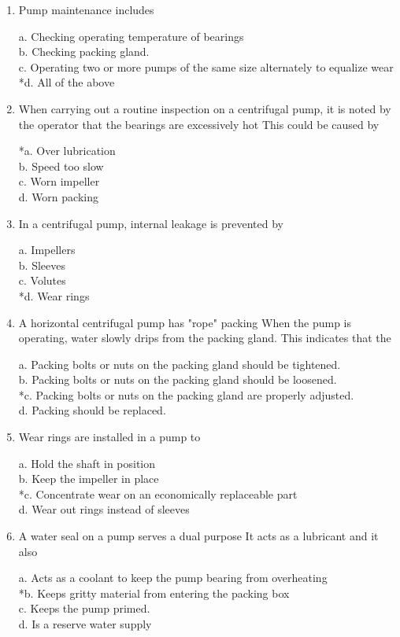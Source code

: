 \begin{enumerate}[1.]
\item  Pump maintenance includes 

a. Checking operating temperature of bearings \\
b. Checking packing gland. \\
c. Operating two or more pumps of the same size alternately to equalize wear \\
*d. All of the above 


\item  When carrying out a routine inspection on a centrifugal pump, it is noted by the operator that the bearings are excessively hot This could be caused by 

*a. Over lubrication \\
b. Speed too slow \\
c. Worn impeller \\
d. Worn packing 


\item  In a centrifugal pump, internal leakage is prevented by 

a. Impellers \\
b. Sleeves \\
c. Volutes \\
*d. Wear rings 


\item  A horizontal centrifugal pump has "rope" packing When the pump is operating, water slowly drips from the packing gland. This indicates that the 

a. Packing bolts or nuts on the packing gland should be tightened. \\
b. Packing bolts or nuts on the packing gland should be loosened. \\
*c. Packing bolts or nuts on the packing gland are properly adjusted. \\
d. Packing should be replaced. 


\item  Wear rings are installed in a pump to 

a. Hold the shaft in position \\
b. Keep the impeller in place \\
*c. Concentrate wear on an economically replaceable part \\
d. Wear out rings instead of sleeves 


\item  A water seal on a pump serves a dual purpose It acts as a lubricant and it also 

a. Acts as a coolant to keep the pump bearing from overheating \\
*b. Keeps gritty material from entering the packing box \\
c. Keeps the pump primed. \\
d. Is a reserve water supply 



\end{enumerate}
